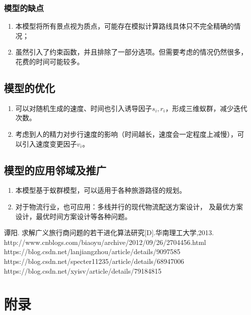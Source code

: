 \documentclass[hyperref,UTF8]{article}
\renewcommand\appendix{\setcounter{secnumdepth}{-2}}
\begin{document}
{\subsubsection{模型的缺点}
\begin{enumerate}
\item 本模型将所有景点视为质点，可能存在模拟计算路线具体只不完全精确的情况；
\item 虽然引入了约束函数，并且排除了一部分选项。但需要考虑的情况仍然很多，花费的时间可能较多。
\end{enumerate}
\subsection{模型的优化}
\begin{enumerate}
\item 可以对随机生成的速度、时间也引入诱导因子$s_i,r_i$，形成三维蚁群，减少迭代次数。
\item 考虑到人的精力对步行速度的影响（时间越长，速度会一定程度上减慢），可以引入速度变更因子$v_i$。
\end{enumerate}

\subsection{模型的应用邻域及推广}
\begin{enumerate}
\item 本模型基于蚁群模型，可以适用于各种旅游路径的规划。
\item 对于物流行业，也可应用：多线并行的现代物流配送方案设计，
及最优方案设计，最优时间方案设计等各种问题。
\end{enumerate}

\begin{thebibliography}{99}
谭阳. 求解广义旅行商问题的若干进化算法研究[D].华南理工大学,2013.
http://www.cnblogs.com/biaoyu/archive/2012/09/26/2704456.html
https://blog.csdn.net/lanjiangzhou/article/details/9097585
https://blog.csdn.net/specter11235/article/details/68947006
https://blog.csdn.net/xyisv/article/details/79184815
\end{thebibliography}
}
\appendix
\section{附录}
\end{document}
